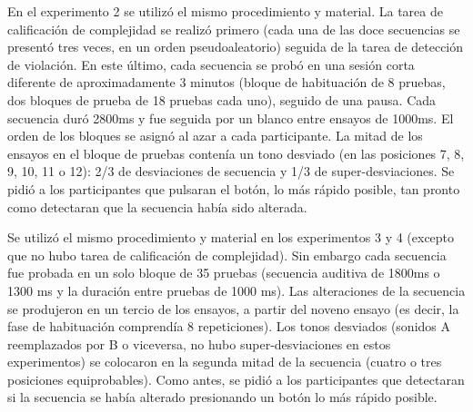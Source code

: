 En el experimento 2 se utilizó el mismo procedimiento y material. La tarea de calificación de complejidad se realizó primero (cada una de las doce secuencias se presentó tres veces, en un orden pseudoaleatorio) seguida de la tarea de detección de violación. En este último, cada secuencia se probó en una sesión corta diferente de aproximadamente 3 minutos (bloque de habituación de 8 pruebas, dos bloques de prueba de 18 pruebas cada uno), seguido de una pausa. Cada secuencia duró 2800ms y fue seguida por un blanco entre ensayos de 1000ms. El orden de los bloques se asignó al azar a cada participante. La mitad de los ensayos en el bloque de pruebas contenía un tono desviado (en las posiciones 7, 8, 9, 10, 11 o 12): 2/3 de desviaciones de secuencia y 1/3 de super-desviaciones. Se pidió a los participantes que pulsaran el botón, lo más rápido posible, tan pronto como detectaran que la secuencia había sido alterada.


Se utilizó el mismo procedimiento y material en los experimentos 3 y 4 (excepto que no hubo tarea de calificación de complejidad). Sin embargo cada secuencia fue probada en un solo bloque de 35 pruebas (secuencia auditiva de 1800ms o 1300 ms y la duración entre pruebas de 1000 ms). Las alteraciones de la secuencia se produjeron en un tercio de los ensayos, a partir del noveno ensayo (es decir, la fase de habituación comprendía 8 repeticiones). Los tonos desviados (sonidos A reemplazados por B o viceversa, no hubo super-desviaciones en estos experimentos) se colocaron en la segunda mitad de la secuencia (cuatro o tres posiciones equiprobables). Como antes, se pidió a los participantes que detectaran si la secuencia se había alterado presionando un botón lo más rápido posible.

